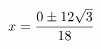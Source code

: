 \documentclass[preview]{standalone}
\begin{document}
\begin{align*}
\special{dvisvgm:raw <g id='unique000'>}x=\frac{0\pm{12 \sqrt{3}}}{18}\special{dvisvgm:raw </g>}
\end{align*}
\end{document}
